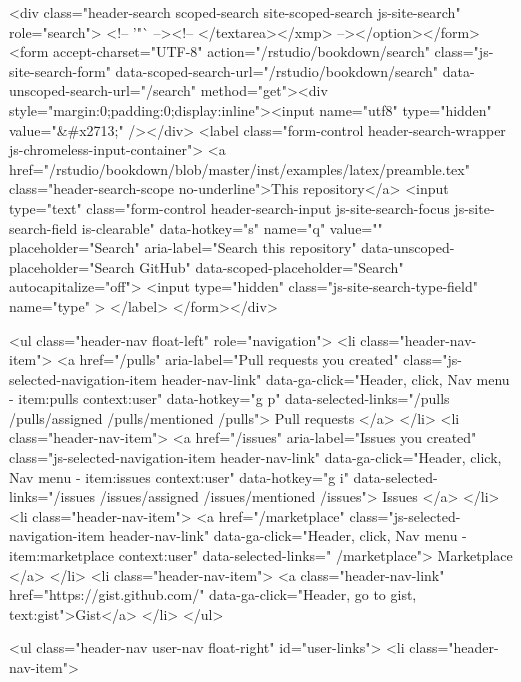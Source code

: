         <div class="header-search scoped-search site-scoped-search js-site-search" role="search">
  <!-- '"` --><!-- </textarea></xmp> --></option></form><form accept-charset="UTF-8" action="/rstudio/bookdown/search" class="js-site-search-form" data-scoped-search-url="/rstudio/bookdown/search" data-unscoped-search-url="/search" method="get"><div style="margin:0;padding:0;display:inline"><input name="utf8" type="hidden" value="&#x2713;" /></div>
    <label class="form-control header-search-wrapper js-chromeless-input-container">
        <a href="/rstudio/bookdown/blob/master/inst/examples/latex/preamble.tex" class="header-search-scope no-underline">This repository</a>
      <input type="text"
        class="form-control header-search-input js-site-search-focus js-site-search-field is-clearable"
        data-hotkey="s"
        name="q"
        value=""
        placeholder="Search"
        aria-label="Search this repository"
        data-unscoped-placeholder="Search GitHub"
        data-scoped-placeholder="Search"
        autocapitalize="off">
        <input type="hidden" class="js-site-search-type-field" name="type" >
    </label>
</form></div>


      <ul class="header-nav float-left" role="navigation">
        <li class="header-nav-item">
          <a href="/pulls" aria-label="Pull requests you created" class="js-selected-navigation-item header-nav-link" data-ga-click="Header, click, Nav menu - item:pulls context:user" data-hotkey="g p" data-selected-links="/pulls /pulls/assigned /pulls/mentioned /pulls">
            Pull requests
</a>        </li>
        <li class="header-nav-item">
          <a href="/issues" aria-label="Issues you created" class="js-selected-navigation-item header-nav-link" data-ga-click="Header, click, Nav menu - item:issues context:user" data-hotkey="g i" data-selected-links="/issues /issues/assigned /issues/mentioned /issues">
            Issues
</a>        </li>
            <li class="header-nav-item">
              <a href="/marketplace" class="js-selected-navigation-item header-nav-link" data-ga-click="Header, click, Nav menu - item:marketplace context:user" data-selected-links=" /marketplace">
                Marketplace
</a>            </li>
          <li class="header-nav-item">
            <a class="header-nav-link" href="https://gist.github.com/" data-ga-click="Header, go to gist, text:gist">Gist</a>
          </li>
      </ul>

    
<ul class="header-nav user-nav float-right" id="user-links">
  <li class="header-nav-item">
    
